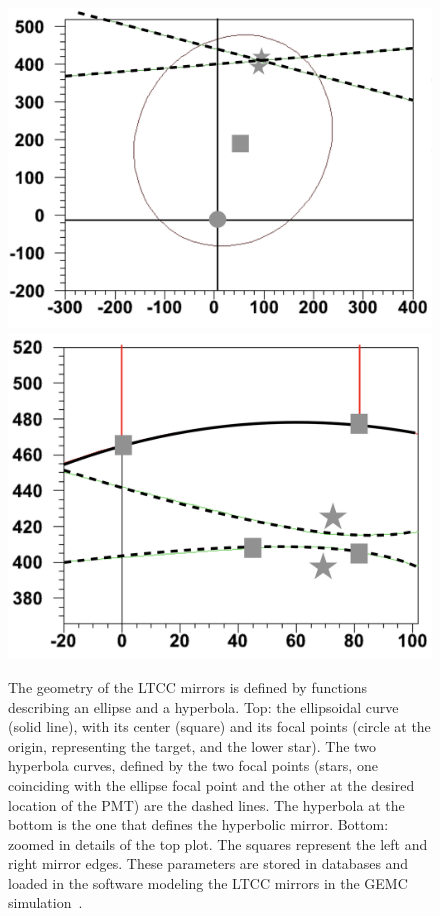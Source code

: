 \begin{figure}
	\centering
	\includegraphics[width=0.98\columnwidth,keepaspectratio]{img/mirrorMath1.png}
	\includegraphics[width=0.98\columnwidth,keepaspectratio]{img/mirrorMath2.png}
	\caption{The geometry of the LTCC mirrors is defined by functions describing an ellipse and a hyperbola. Top: the
          ellipsoidal curve (solid line), with its center (square) and its focal points (circle at the origin, representing the
          target, and the lower star). The two hyperbola curves, defined by the two focal points (stars, one coinciding
          with the ellipse focal point and the other at the desired location of the PMT) are the dashed lines. The hyperbola
          at the bottom is the one that defines the hyperbolic mirror. Bottom: zoomed in details of the top plot. The
          squares represent the left and right mirror edges. These parameters are stored in databases and loaded in the
          software modeling the LTCC mirrors in the GEMC simulation~\cite{sim-nim}.}
	\label{fig:mirrorMath}
\end{figure}

